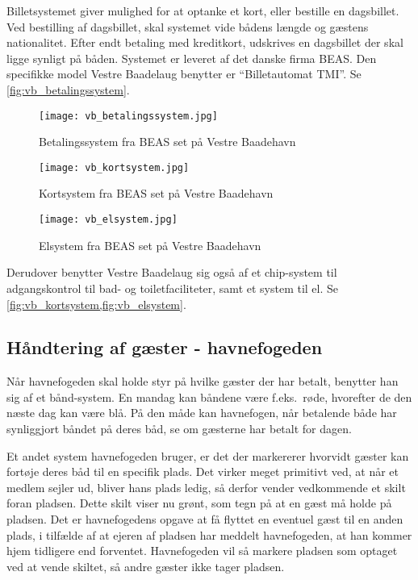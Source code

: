 Billetsystemet giver mulighed for at optanke et kort, eller bestille en dagsbillet. Ved bestilling af dagsbillet, skal systemet vide bådens længde og gæstens nationalitet. Efter endt betaling med kreditkort, udskrives en dagsbillet der skal ligge synligt på båden. Systemet er leveret af det danske firma BEAS. Den specifikke model Vestre Baadelaug benytter er \enquote{Billetautomat TMI}. Se \cref{fig:vb_betalingssystem}.

\begin{figure}
  \centering
  \begin{minipage}{0.45\textwidth}
    \texttt{[image: vb\_betalingssystem.jpg]}
    \caption{Betalingssystem fra BEAS set på Vestre Baadehavn}
    \label{fig:vb_betalingssystem}
  \end{minipage}
  \hfill
  \begin{minipage}{0.45\textwidth}
    \texttt{[image: vb\_kortsystem.jpg]}
    \caption{Kortsystem fra BEAS set på Vestre Baadehavn}
    \label{fig:vb_kortsystem}
  \end{minipage}
  \begin{minipage}{0.45\textwidth}
    \texttt{[image: vb\_elsystem.jpg]}
    \caption{Elsystem fra BEAS set på Vestre Baadehavn}
    \label{fig:vb_elsystem}
  \end{minipage}
\end{figure}


Derudover benytter Vestre Baadelaug sig også af et chip-system til adgangskontrol til bad- og toiletfaciliteter, samt et system til el. Se \cref{fig:vb_kortsystem,fig:vb_elsystem}.


\subsection{Håndtering af gæster - havnefogeden} %
\label{sub:havnefogeden}

Når havnefogeden skal holde styr på hvilke gæster der har betalt, benytter han sig af et bånd-system. En mandag kan båndene være f.eks.\ røde, hvorefter de den næste dag kan være blå. På den måde kan havnefogen, når betalende både har synliggjort båndet på deres båd, se om gæsterne har betalt for dagen.

Et andet system havnefogeden bruger, er det der markererer hvorvidt gæster kan fortøje deres båd til en specifik plads. Det virker meget primitivt ved, at når et medlem sejler ud, bliver hans plads ledig, så derfor vender vedkommende et skilt foran pladsen. Dette skilt viser nu grønt, som tegn på at en gæst må holde på pladsen. Det er havnefogedens opgave at få flyttet en eventuel gæst til en anden plads, i tilfælde af at ejeren af pladsen har meddelt havnefogeden, at han kommer hjem tidligere end forventet. Havnefogeden vil så markere pladsen som optaget ved at vende skiltet, så andre gæster ikke tager pladsen.

